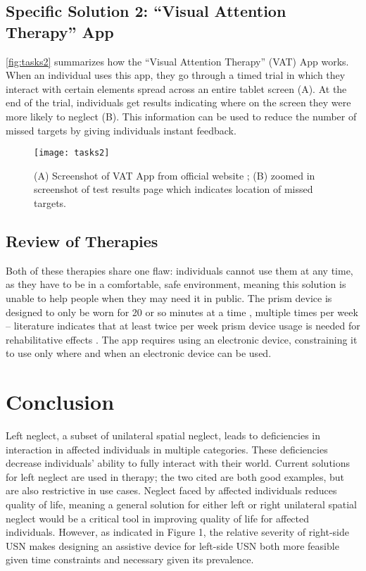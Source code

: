\subsection{Specific Solution 2: “Visual Attention Therapy” App}

\autoref{fig:tasks2} summarizes how the “Visual Attention Therapy” (VAT) App
works. When an individual uses this app, they go through a timed trial in which
they interact with certain elements spread across an entire tablet screen
(A). At the end of the trial, individuals get results indicating where on the
screen they were more likely to neglect (B). This information can be used to
reduce the number of missed targets by giving individuals instant feedback.

\begin{figure}[h]
  \centering
  \texttt{[image: tasks2]}
  \caption[VAT App.]{(A) Screenshot of VAT App from official website
    \cite{tactustherapy_visual_nodate}; (B)
    zoomed in screenshot of test results page which indicates location of
    missed targets.}
  \label{fig:tasks2}
\end{figure}

\subsection{Review of Therapies}

Both of these therapies share one flaw: individuals cannot use them at any
time, as they have to be in a comfortable, safe environment, meaning this
solution is unable to help people when they may need it in public. The prism
device is designed to only be worn for 20 or so minutes at a time
\cite{goedert_prism_2015}, multiple times per week – literature indicates that
at least twice per week prism device usage is needed for rehabilitative effects
\cite{goedert_prism_2015}. The app requires using an electronic device,
constraining it to use only where and when an electronic device can be used.

\section{Conclusion}
Left neglect, a subset of unilateral spatial neglect, leads to deficiencies in
interaction in affected individuals in multiple categories. These deficiencies
decrease individuals’ ability to fully interact with their world. Current
solutions for left neglect are used in therapy; the two cited are both good
examples, but are also restrictive in use cases. Neglect faced by affected
individuals reduces quality of life, meaning a general solution for either left
or right unilateral spatial neglect would be a critical tool in improving
quality of life for affected individuals. However, as indicated in Figure 1,
the relative severity of right-side USN makes designing an assistive device for
left-side USN both more feasible given time constraints and necessary given its
prevalence.

